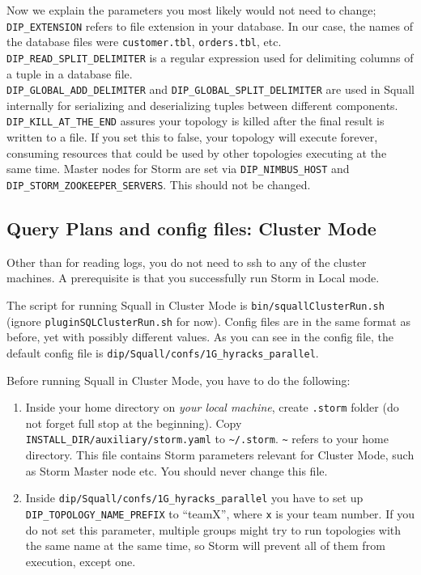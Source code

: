 \documentclass[a4paper,10pt]{article}
\begin{document}
Now we explain the parameters you most likely would not need to change; \\ \verb|DIP_EXTENSION| refers to file extension in your database. In our case, the names of the database files were \verb|customer.tbl|, \verb|orders.tbl|, etc. \\ \verb|DIP_READ_SPLIT_DELIMITER| is a regular expression used for delimiting columns of a tuple in a database file. \\ \verb|DIP_GLOBAL_ADD_DELIMITER| and \verb|DIP_GLOBAL_SPLIT_DELIMITER| are used in Squall internally for serializing and deserializing tuples between different components. \verb|DIP_KILL_AT_THE_END| assures your topology is killed after the final result is written to a file. If you set this to false, your topology will execute forever, consuming resources that could be used by other topologies executing at the same time. Master nodes for Storm are set via \verb|DIP_NIMBUS_HOST| and \verb|DIP_STORM_ZOOKEEPER_SERVERS|. This should not be changed.

\subsection{Query Plans and config files: Cluster Mode}
Other than for reading logs, you do not need to ssh to any of the cluster machines. A prerequisite is that you successfully run Storm in Local mode.

The script for running Squall in Cluster Mode is \verb#bin/squallClusterRun.sh# (ignore \verb#pluginSQLClusterRun.sh# for now). Config files are in the same format as before, yet with possibly different values. As you can see in the config file, the default config file is \verb#dip/Squall/confs/1G_hyracks_parallel#. 

Before running Squall in Cluster Mode, you have to do the following:
\begin{enumerate}
 \item Inside your home directory on \textit{your local machine}, create \verb#.storm# folder (do not forget full stop at the beginning). Copy \verb#INSTALL_DIR/auxiliary/storm.yaml# to \verb#~/.storm#. \verb#~# refers to your home directory. This file contains Storm parameters relevant for Cluster Mode, such as Storm Master node etc. You should never change this file.
 \item Inside  \verb#dip/Squall/confs/1G_hyracks_parallel# you have to set up \\ \verb#DIP_TOPOLOGY_NAME_PREFIX# to ``teamX'', where \verb#x# is your team number. If you do not set this parameter, multiple groups might try to run topologies with the same name at the same time, so Storm will prevent all of them from execution, except one.
\end{enumerate}
\end{document}
